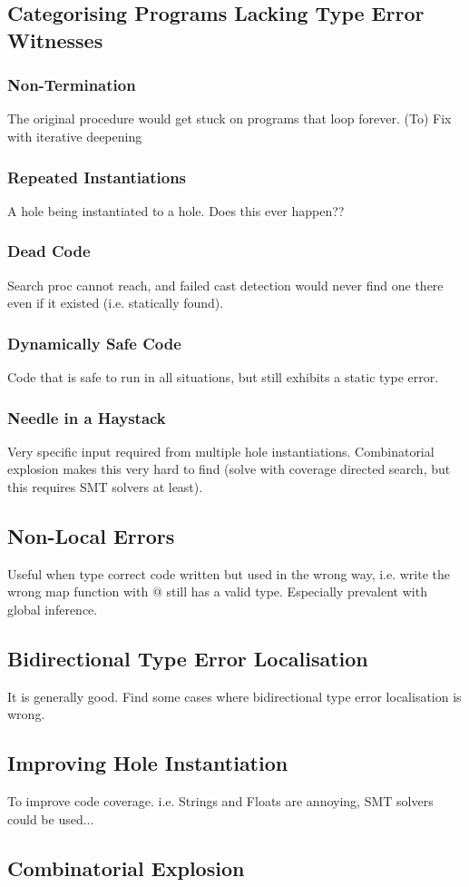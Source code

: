 \subsection{Categorising Programs Lacking Type Error Witnesses}
\subsubsection{Non-Termination}
The original procedure would get stuck on programs that loop forever. (To) Fix with iterative deepening
\subsubsection{Repeated Instantiations}
A hole being instantiated to a hole. Does this ever happen??
\subsubsection{Dead Code}
Search proc cannot reach, and failed cast detection would never find one there even if it existed (i.e. statically found).
\subsubsection{Dynamically Safe Code}
Code that is safe to run in all situations, but still exhibits a static type error.

\subsubsection{Needle in a Haystack}
Very specific input required from multiple hole instantiations. Combinatorial explosion makes this very hard to find (solve with coverage directed search, but this requires SMT solvers at least).

\subsection{Non-Local Errors}
Useful when type correct code written but used in the wrong way, i.e. write the wrong map function with @ still has a valid type. Especially prevalent with global inference.
\subsection{Bidirectional Type Error Localisation}
It is generally good. Find some cases where bidirectional type error localisation is wrong.
\subsection{Improving Hole Instantiation}
To improve code coverage. i.e. Strings and Floats are annoying, SMT solvers could be used...
\subsection{Combinatorial Explosion}

